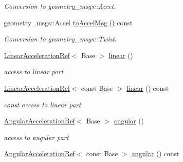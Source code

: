 \begin{DoxyCompactItemize}
\begin{DoxyCompactList}\small\item\em Conversion to geometry\+\_\+msgs\+::\+Accel. \end{DoxyCompactList}\item 
geometry\+\_\+msgs\+::\+Accel \hyperlink{classow__core_1_1CartesianAcceleration_a127f662e061666d70174897ac315b834}{to\+Accel\+Msg} () const \hypertarget{classow__core_1_1CartesianAcceleration_a127f662e061666d70174897ac315b834}{}\label{classow__core_1_1CartesianAcceleration_a127f662e061666d70174897ac315b834}

\begin{DoxyCompactList}\small\item\em Conversion to geometry\+\_\+msgs\+::\+Twist. \end{DoxyCompactList}\item 
\hyperlink{classow__core_1_1LinearAccelerationRef}{Linear\+Acceleration\+Ref}$<$ Base $>$ \hyperlink{classow__core_1_1CartesianAcceleration_ac814340c03e8322c39db961010f67788}{linear} ()\hypertarget{classow__core_1_1CartesianAcceleration_ac814340c03e8322c39db961010f67788}{}\label{classow__core_1_1CartesianAcceleration_ac814340c03e8322c39db961010f67788}

\begin{DoxyCompactList}\small\item\em access to linear part \end{DoxyCompactList}\item 
\hyperlink{classow__core_1_1LinearAccelerationRef}{Linear\+Acceleration\+Ref}$<$ const Base $>$ \hyperlink{classow__core_1_1CartesianAcceleration_a97e1512119cc3d73c89c50d52a573c07}{linear} () const \hypertarget{classow__core_1_1CartesianAcceleration_a97e1512119cc3d73c89c50d52a573c07}{}\label{classow__core_1_1CartesianAcceleration_a97e1512119cc3d73c89c50d52a573c07}

\begin{DoxyCompactList}\small\item\em const access to linear part \end{DoxyCompactList}\item 
\hyperlink{classow__core_1_1AngularAccelerationRef}{Angular\+Acceleration\+Ref}$<$ Base $>$ \hyperlink{classow__core_1_1CartesianAcceleration_a6569c3763520f857155bca2265cf43c3}{angular} ()\hypertarget{classow__core_1_1CartesianAcceleration_a6569c3763520f857155bca2265cf43c3}{}\label{classow__core_1_1CartesianAcceleration_a6569c3763520f857155bca2265cf43c3}

\begin{DoxyCompactList}\small\item\em access to angular part \end{DoxyCompactList}\item 
\hyperlink{classow__core_1_1AngularAccelerationRef}{Angular\+Acceleration\+Ref}$<$ const Base $>$ \hyperlink{classow__core_1_1CartesianAcceleration_a0573ab2161d29d4956322067f433fa04}{angular} () const \hypertarget{classow__core_1_1CartesianAcceleration_a0573ab2161d29d4956322067f433fa04}{}\label{classow__core_1_1CartesianAcceleration_a0573ab2161d29d4956322067f433fa04}


\end{DoxyCompactItemize}
